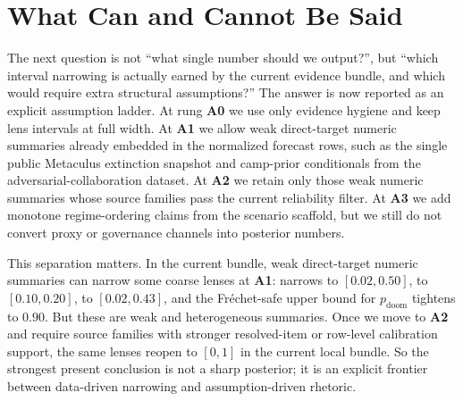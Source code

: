 \documentclass[11pt,openany]{report}
\begin{document}
\begin{table}[htbp]
\centering
\caption{Generated source-role summary used for manuscript-facing
discussion and review auditability.}
\label{tab:ai-outcomes-source-summary}
\end{table}

\section{What Can and Cannot Be Said}

The next question is not ``what single number should we output?'', but
``which interval narrowing is actually earned by the current evidence
bundle, and which would require extra structural assumptions?''  The
answer is now reported as an explicit assumption ladder.  At rung
\textbf{A0} we use only evidence hygiene and keep lens intervals at full
width.  At \textbf{A1} we allow weak direct-target numeric summaries
already embedded in the normalized forecast rows, such as the single
public Metaculus extinction snapshot and camp-prior conditionals from
the adversarial-collaboration dataset.  At \textbf{A2} we retain only
those weak numeric summaries whose source families pass the current
reliability filter.  At \textbf{A3} we add monotone regime-ordering
claims from the scenario scaffold, but we still do not convert proxy or
governance channels into posterior numbers.

This separation matters.  In the current bundle, weak direct-target
numeric summaries can narrow some coarse lenses at \textbf{A1}:
 narrows to $[0.02, 0.50]$,
 to $[0.10, 0.20]$,
 to $[0.02, 0.43]$, and the
Fr\'{e}chet-safe upper bound for $p_{\mathrm{doom}}$ tightens to $0.90$.
But these are weak and heterogeneous summaries.  Once we move to
\textbf{A2} and require source families with stronger resolved-item or
row-level calibration support, the same lenses reopen to $[0,1]$ in the
current local bundle.  So the strongest present conclusion is not a
sharp posterior; it is an explicit frontier between data-driven
narrowing and assumption-driven rhetoric.
\end{document}
